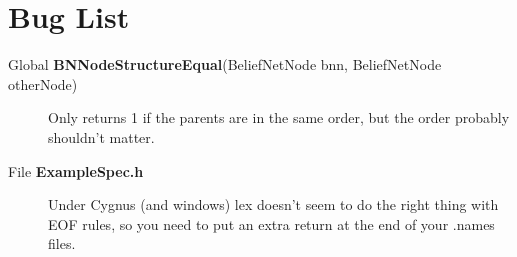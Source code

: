 \section{Bug List}\label{bug}
\label{_bug000001}
 \begin{description}
\item[Global {\bf BNNode\-Structure\-Equal}(Belief\-Net\-Node bnn, Belief\-Net\-Node other\-Node) ]Only returns 1 if the parents are in the same order, but the order probably shouldn't matter. \end{description}


\label{_bug000002}
 \begin{description}
\item[File {\bf Example\-Spec.h} ]Under Cygnus (and windows) lex doesn't seem to do the right thing with EOF rules, so you need to put an extra return at the end of your .names files. \end{description}
